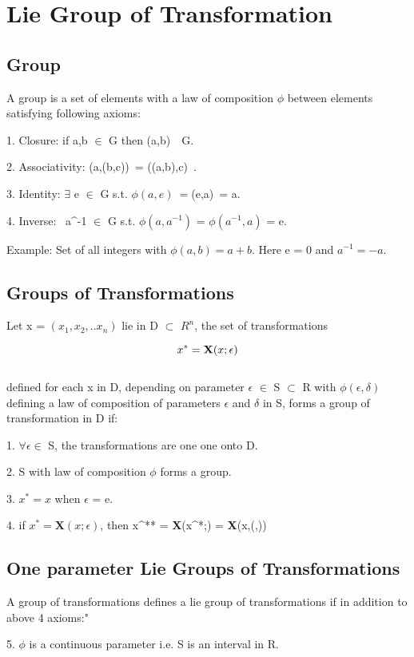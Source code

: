 \documentclass[A4paper, 22pt]{article}
\begin{document}
\section{Lie Group of Transformation}

\subsection{Group}  A group is a set of elements with a law of composition $\phi$   between elements satisfying following axioms:

1. Closure: if a,b $\in$ G then \phi(a,b)\ \in\ G.

2. Associativity: \phi(a,\phi(b,c))\ = \phi(\phi(a,b),c)\ .

3. Identity: $\exists$  e $\in$   G   s.t. $\phi(a,e)\ = $\phi(e,a)\ = a.

4. Inverse: \exists\ a^{-1} $\in$ G  s.t. $\phi(a,a^{-1})$ = $\phi(a^{-1},a)$ = e.

Example: Set of all integers with $\phi(a,b) = a + b$. Here e = 0 and $a^{-1} = -a.$
\subsection{Groups of Transformations} Let x = $(x_1, x_2,.. x_n)$ lie in D $\subset$ $R^{n}$, the set of transformations 

 \[      \mathnormal{x^{*} = \textbf{X}(x;\epsilon)}\] \\
defined for each x in D, depending on parameter $\epsilon$ $\in$ S $\subset$ R with $\phi(\epsilon,\delta)$ defining a law of composition of parameters $\epsilon$ and $\delta$ in S, forms a group of transformation in D if:

1. $\forall \epsilon  \in$ S, the transformations are one one onto D.

2. S with law of composition $\phi$ forms a group.

3. $x^{*} = x$  when $\epsilon$ = e.
 
4. if $x^{*} = \textbf{X}(x;\epsilon)$, then x^{**} = \textbf{X}(x^{*};\delta) = \textbf{X}(x,\phi(\epsilon,\delta))

\subsection{One parameter Lie Groups of Transformations}
A group of transformations defines a lie group of transformations if in addition to above 4 axioms:"

5. $\phi$ is a continuous parameter i.e. S is an interval in R.
\end{document}
